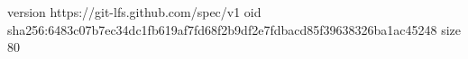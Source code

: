 version https://git-lfs.github.com/spec/v1
oid sha256:6483c07b7ec34dc1fb619af7fd68f2b9df2e7fdbacd85f39638326ba1ac45248
size 80
